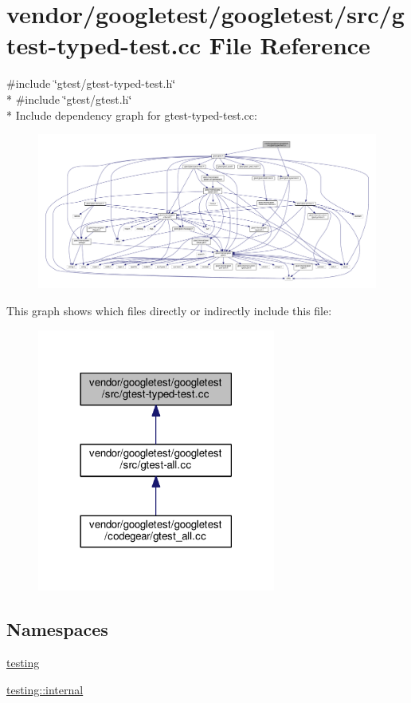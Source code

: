 \hypertarget{gtest-typed-test_8cc}{}\section{vendor/googletest/googletest/src/gtest-\/typed-\/test.cc File Reference}
\label{gtest-typed-test_8cc}
{\ttfamily \#include \char`\"{}gtest/gtest-\/typed-\/test.\+h\char`\"{}}\\*
{\ttfamily \#include \char`\"{}gtest/gtest.\+h\char`\"{}}\\*
Include dependency graph for gtest-\/typed-\/test.cc\+:\nopagebreak
\begin{figure}[H]
\begin{center}
\leavevmode
\includegraphics[width=350pt]{gtest-typed-test_8cc__incl}
\end{center}
\end{figure}
This graph shows which files directly or indirectly include this file\+:\nopagebreak
\begin{figure}[H]
\begin{center}
\leavevmode
\includegraphics[width=222pt]{gtest-typed-test_8cc__dep__incl}
\end{center}
\end{figure}
\subsection*{Namespaces}
\begin{DoxyCompactItemize}
\item 
 \hyperlink{namespacetesting}{testing}
\item 
 \hyperlink{namespacetesting_1_1internal}{testing\+::internal}
\end{DoxyCompactItemize}

